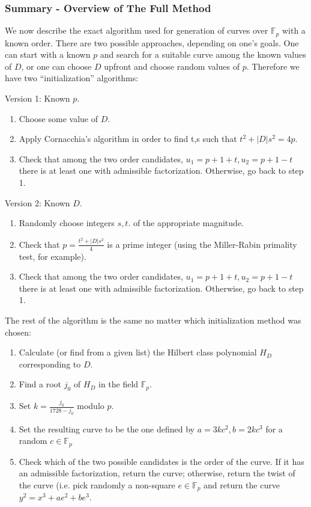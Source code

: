 \documentclass[11pt,english]{article}
\begin{document}
\subsubsection{Summary - Overview of The Full Method}
We now describe the exact algorithm used for generation of curves over $\mathbb{F}_p$ with a known order. There are two possible approaches, depending on one's goals.
One can start with a known $p$ and search for a suitable curve among the known values of $D$, or one can choose $D$ upfront and choose random values of $p$. Therefore we have
two ``initialization'' algorithms:

Version 1: Known $p$.
\begin{enumerate}
 \item Choose some value of $D$.
 \item Apply Cornacchia's algorithm in order to find t,s such that $t^2+|D|s^2=4p$.
 \item Check that among the two order candidates, $u_1=p+1+t,u_2=p+1-t$ there is at least one with admissible factorization. Otherwise, go back to step 1.
\end{enumerate}

Version 2: Known $D$.
\begin{enumerate}
 \item Randomly choose integers $s,t$. of the appropriate magnitude.
 \item Check that $p=\frac{t^2+|D|s^2}{4}$ is a prime integer (using the Miller-Rabin primality test, for example).
 \item Check that among the two order candidates, $u_1=p+1+t,u_2=p+1-t$ there is at least one with admissible factorization. Otherwise, go back to step 1.
\end{enumerate}

The rest of the algorithm is the same no matter which initialization method was chosen:

\begin{enumerate}
 \item Calculate (or find from a given list) the Hilbert class polynomial $H_D$ corresponding to $D$.
 \item Find a root $j_0$ of $H_D$ in the field $\mathbb{F}_p$.
 \item Set $k=\frac{j_0}{1728-j_0}$ modulo $p$.
 \item Set the resulting curve to be the one defined by $a=3kc^2,b=2kc^3$ for a random $c\in\mathbb{F}_p$
 \item Check which of the two possible candidates is the order of the curve. If it has an admissible factorization, return the curve; otherwise,
	  return the twist of the curve (i.e. pick randomly a non-square $e\in\mathbb{F}_p$ and return the curve $y^2=x^3+ae^2+be^3$.
\end{enumerate}
\end{document}
